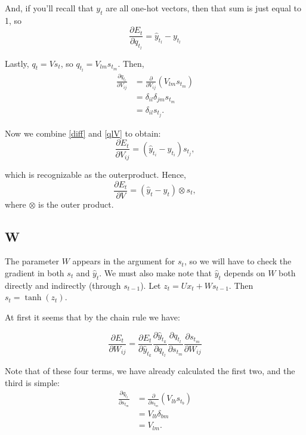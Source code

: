 \documentclass[11pt,twoside]{article}
\begin{document}
\noindent And, if you'll recall that $y_t$ are all one-hot vectors, then that sum is just equal to 1, so
\begin{equation}
\label{diff}
\frac{\partial E_t}{\partial q_{t_l}}=\hat{y}_{t_l}-y_{t_l}
\end{equation}


\noindent Lastly, $q_t=V s_t$, so $q_{t_l}=V_{l m}s_{t_m}$. Then,
\begin{subequations}
\begin{align}
\frac{\partial q_{t_l}}{\partial V_{i j}} &= \frac{\partial }{\partial V_{i j}}\left(V_{l m} s_{t_m}\right) \\
	&= \delta_{i l}\delta_{j m}s_{t_m} \\
\label{qlV}
	&= \delta_{i l}s_{t_j}.
\end{align}
\end{subequations}

\noindent Now we combine \eqref{diff} and \eqref{qlV} to obtain:
\begin{equation}
\frac{\partial E_t}{\partial V_{i j}}=\left(\hat{y}_{t_i}-y_{t_i}\right) s_{t_j},
\end{equation}

\noindent which is recognizable as the outerproduct. Hence,
\begin{equation}
\frac{\partial E_t}{\partial V}=\left(\hat{y}_t-y_t\right) \otimes s_t,
\end{equation}
\noindent where $\otimes$ is the outer product.

\subsection{W}
The parameter $W$ appears in the argument for $s_t$, so we will have to check the gradient in both $s_t$ and $\hat{y}_t$. We must also make note that $\hat{y}_t$ depends on $W$ both directly and indirectly (through $s_{t-1}$). Let $z_t=Ux_t+Ws_{t-1}$. Then $s_t=\tanh(z_t)$.

\noindent At first it seems that by the chain rule we have:

\begin{equation}
\frac{\partial E_t}{\partial W_{ij}}=\frac{\partial E_t}{\partial \hat{y}_{t_k}}\frac{\partial \hat{y}_{t_k}}{\partial q_{t_l}}\frac{\partial q_{t_l}}{\partial s_{t_m}}\frac{\partial s_{t_m}}{\partial W_{ij}}
\end{equation}

\noindent Note that of these four terms, we have already calculated the first two, and the third is simple:
\begin{subequations}
\begin{align}
\frac{\partial q_{t_l}}{\partial s_{t_m}} &= \frac{\partial }{\partial s_{t_m}}\left(V_{lb}s_{t_b}\right) \\
&= V_{lb}\delta_{bm} \\
&= V_{lm}.
\end{align}
\end{subequations}
\end{document}
